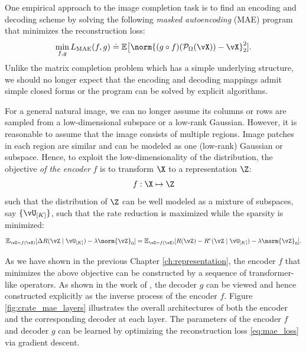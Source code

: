 \documentclass[../../book-main.tex]{subfiles}
\begin{document}
One empirical approach to the image completion task is to find an encoding and decoding scheme by
solving the following {\em masked autoencoding} (MAE) program that
minimizes the reconstruction loss:
\begin{equation}\label{eq:mae_loss}
\min_{f, g} L_{\mathrm{MAE}}(f, g) \doteq \mathbb{E}\big[\norm{(g \circ
f)(\mathcal{P}_\Omega(\vX)) - \vX}_{2}^{2}].
\end{equation}
Unlike the matrix completion problem which has a simple underlying
structure, we should no longer expect that the encoding and decoding
mappings admit simple closed forms or the program can be solved by
explicit algorithms.

For a general natural image, we can no longer assume its columns or
rows are sampled from a low-dimensional subspace or a low-rank
Gaussian. However, it is reasonable to assume that the image consists
of multiple regions. Image patches in each region are similar and can
be modeled as one (low-rank) Gaussian or subspace. Hence, to exploit
the low-dimensionality of the distribution, the objective \textit{of the
encoder} $f$ is to transform $\X$ to a representation $\Z$:
\begin{equation}
    f: \X \mapsto \Z
\end{equation}
such that the distribution of $\Z$ can be well modeled as a mixture of subspaces, say $\{\vU_{[K]}\}$,
such that the rate reduction is maximized while the sparsity is minimized:
\begin{equation}\label{eq:sparse_rr}
\mathbb{E}_{\vZ = f(\vX)}[\Delta R(\vZ \mid \vU_{[K]}) - \lambda
\norm{\vZ}_{0}] = \mathbb{E}_{\vZ = f(\vX)}[R(\vZ) - R^{c}(\vZ \mid
\vU_{[K]}) - \lambda \norm{\vZ}_{0}].
\end{equation}

As we have shown in the previous Chapter \ref{ch:representation}, the
encoder $f$ that minimizes the above objective can be constructed by
a sequence of transformer-like operators. As shown in the work of
\cite{Pai2024masked}, the decoder $g$ can be viewed and hence
constructed explicitly as the inverse process of the encoder $f$.
Figure \ref{fig:crate_mae_layers} illustrates the overall
architectures of both the encoder and the corresponding decoder at
each layer. The parameters of the encoder $f$ and decoder $g$ can be
learned by optimizing the reconstruction loss \eqref{eq:mae_loss} via
gradient descent.
\end{document}

